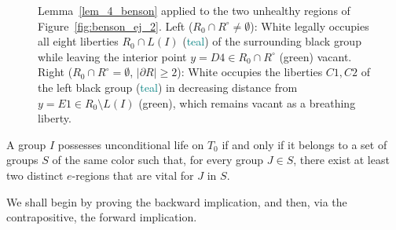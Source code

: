 \begin{figure}[H]
	\centering
	\begin{goban}[7, hoshi = false]
	\end{goban}
	\quad
	\begin{goban}[7, hoshi = false]
	\end{goban}
	\caption{Lemma~\ref{lem_4_benson} applied to the two unhealthy regions of Figure~\ref{fig:benson_ej_2}. Left ($R_0 \cap R^\circ \neq \emptyset$): White legally occupies all eight liberties $R_0 \cap L(I)$ (\textcolor{teal}{teal}) of the surrounding black group while leaving the interior point $y = D4 \in R_0 \cap R^\circ$ (\textcolor{Moss}{green}) vacant. Right ($R_0 \cap R^\circ = \emptyset$, $|\partial R| \ge 2$): White occupies the liberties $C1, C2$ of the left black group (\textcolor{teal}{teal}) in decreasing distance from $y = E1 \in R_0 \setminus L(I)$ (\textcolor{Moss}{green}), which remains vacant as a breathing liberty.}
	\label{fig:lem_4_benson}
\end{figure}

\begin{theorem}\label{teo_benson}
	A group $I$ possesses unconditional life on $T_0$ if and only if it belongs to a set of groups $S$ of the same color such that, for every group $J \in S$, there exist at least two distinct $e$-regions that are vital for $J$ in $S$.
\end{theorem}

We shall begin by proving the backward implication, and then, via the contrapositive, the forward implication.

